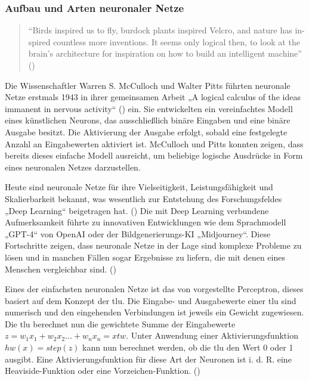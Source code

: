 \subsubsection{Aufbau und Arten neuronaler Netze}

\begin{quote}
  "`Birds inspired us to fly, burdock plants inspired Velcro, and nature has in- spired countless more inventions. It seems only logical then, to look at the brain’s architecture for inspiration on how to build an intelligent machine"' (\cite[S. 279]{Geron2019})
\end{quote}

Die Wissenschaftler Warren S. McCulloch und Walter Pitts führten neuronale Netze erstmals 1943 in ihrer gemeinsamen Arbeit „A logical calculus of the ideas immanent in nervous activity“ (\cite{McCulloch1943}) ein. Sie entwickelten ein vereinfachtes Modell eines künstlichen Neurons, das ausschließlich binäre Eingaben und eine binäre Ausgabe besitzt. Die Aktivierung der Ausgabe erfolgt, sobald eine festgelegte Anzahl an Eingabewerten aktiviert ist. McCulloch und Pitts konnten zeigen, dass bereits dieses einfache Modell ausreicht, um beliebige logische Ausdrücke in Form eines neuronalen Netzes darzustellen.

Heute sind neuronale Netze für ihre Vielseitigkeit, Leistungsfähigkeit und Skalierbarkeit bekannt, was wesentlich zur Entstehung des Forschungsfeldes „Deep Learning“ beigetragen hat. (\cite{Geron2019}) Die mit Deep Learning verbundene Aufmerksamkeit führte zu innovativen Entwicklungen wie dem Sprachmodell „GPT-4“ von OpenAI oder der Bildgenerierungs-KI „Midjourney“. Diese Fortschritte zeigen, dass neuronale Netze in der Lage sind komplexe Probleme zu lösen und in manchen Fällen sogar Ergebnisse zu liefern, die mit denen eines Menschen vergleichbar sind. (\cite{OpenAI2024})

Eines der einfachsten neuronalen Netze ist das von \cite{Rosenblatt1958} vorgestellte Perceptron, dieses basiert auf dem Konzept der \ac{tlu}. Die Eingabe- und Ausgabewerte einer \ac{tlu} sind numerisch und den eingehenden Verbindungen ist jeweils ein Gewicht zugewiesen. Die \ac{tlu} berechnet nun die gewichtete Summe der Eingabewerte \(z=w_1x_1+w_2x_2 ... +w_nx_n=xtw\). Unter Anwendung einer Aktivierungsfunktion \(hw(x)=step(z)\) kann nun berechnet werden, ob die \ac{tlu} den Wert 0 oder 1 ausgibt. Eine Aktivierungsfunktion für diese Art der Neuronen ist i. d. R. eine Heaviside-Funktion oder eine Vorzeichen-Funktion. (\cite[vgl. S. 284 ff.]{Geron2019})

